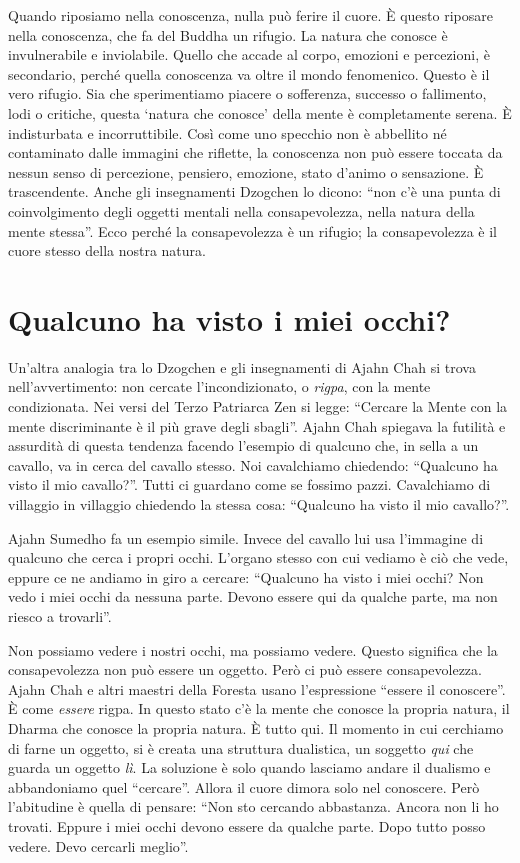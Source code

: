Quando riposiamo nella conoscenza, nulla può ferire il cuore. È questo riposare nella conoscenza, che fa del Buddha un rifugio. La natura che conosce è invulnerabile e inviolabile. Quello che accade al corpo, emozioni e percezioni, è secondario, perché quella conoscenza va oltre il mondo fenomenico. Questo è il vero rifugio. Sia che sperimentiamo piacere o sofferenza, successo o fallimento, lodi o critiche, questa `natura che conosce' della mente è completamente serena. È indisturbata e incorruttibile. Così come uno specchio non è abbellito né contaminato dalle immagini che riflette, la conoscenza non può essere toccata da nessun senso di percezione, pensiero, emozione, stato d'animo o sensazione. È trascendente. Anche gli insegnamenti Dzogchen lo dicono: ``non c'è una punta di coinvolgimento degli oggetti mentali nella consapevolezza, nella natura della mente stessa''. Ecco perché la consapevolezza è un rifugio; la consapevolezza è il cuore stesso della nostra natura.

\section*{Qualcuno ha visto i miei occhi?}

Un'altra analogia tra lo Dzogchen e gli insegnamenti di Ajahn Chah si trova nell'avvertimento: non cercate l'incondizionato, o \textit{rigpa}, con la mente condizionata. Nei versi del Terzo Patriarca Zen si legge: ``Cercare la Mente con la mente discriminante è il più grave degli sbagli''. Ajahn Chah spiegava la futilità e assurdità di questa tendenza facendo l'esempio di qualcuno che, in sella a un cavallo, va in cerca del cavallo stesso. Noi cavalchiamo chiedendo: ``Qualcuno ha visto il mio cavallo?''. Tutti ci guardano come se fossimo pazzi. Cavalchiamo di villaggio in villaggio chiedendo la stessa cosa: ``Qualcuno ha visto il mio cavallo?''.

Ajahn Sumedho fa un esempio simile. Invece del cavallo lui usa l'immagine di qualcuno che cerca i propri occhi. L'organo stesso con cui vediamo è ciò che vede, eppure ce ne andiamo in giro a cercare: ``Qualcuno ha visto i miei occhi? Non vedo i miei occhi da nessuna parte. Devono essere qui da qualche parte, ma non riesco a trovarli''.

Non possiamo vedere i nostri occhi, ma possiamo vedere. Questo significa che la consapevolezza non può essere un oggetto. Però ci può essere consapevolezza. Ajahn Chah e altri maestri della Foresta usano l'espressione ``essere il conoscere''. È come \textit{essere} rigpa. In questo stato c'è la mente che conosce la propria natura, il Dharma che conosce la propria natura. È tutto qui. Il momento in cui cerchiamo di farne un oggetto, si è creata una struttura dualistica, un soggetto \textit{qui} che guarda un oggetto \textit{lì}. La soluzione è solo quando lasciamo andare il dualismo e abbandoniamo quel ``cercare''. Allora il cuore dimora solo nel conoscere. Però l'abitudine è quella di pensare: ``Non sto cercando abbastanza. Ancora non li ho trovati. Eppure i miei occhi devono essere da qualche parte. Dopo tutto posso vedere. Devo cercarli meglio''.

